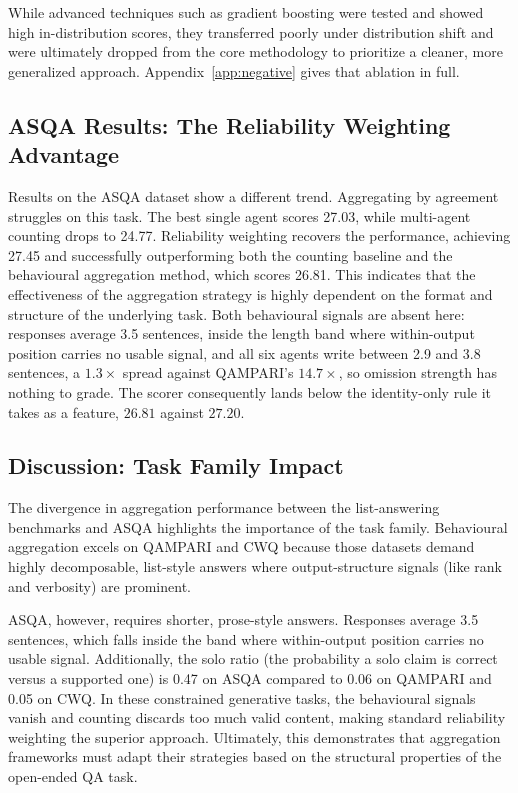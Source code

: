 \documentclass[11pt]{article}
\begin{document}
While advanced techniques such as gradient boosting were tested and showed high in-distribution scores, they transferred poorly under distribution shift and were ultimately dropped from the core methodology to prioritize a cleaner, more generalized approach. Appendix~\ref{app:negative} gives that ablation in full.
\subsection{ASQA Results: The Reliability Weighting Advantage}
\label{sec:rq3}


Results on the ASQA dataset show a different trend. Aggregating by agreement struggles on this task. The best single agent scores 27.03, while multi-agent counting drops to 24.77. Reliability weighting recovers the performance, achieving 27.45 and successfully outperforming both the counting baseline and the behavioural aggregation method, which scores 26.81. This indicates that the effectiveness of the aggregation strategy is highly dependent on the format and structure of the underlying task. Both behavioural signals are absent here: responses average 3.5 sentences, inside the length band where within-output position carries no usable signal, and all six agents write between 2.9 and 3.8 sentences, a $1.3\times$ spread against QAMPARI's $14.7\times$, so omission strength has nothing to grade. The scorer consequently lands below the identity-only rule it takes as a feature, $26.81$ against $27.20$.

\subsection{Discussion: Task Family Impact}

The divergence in aggregation performance between the list-answering benchmarks and ASQA highlights the importance of the task family. Behavioural aggregation excels on QAMPARI and CWQ because those datasets demand highly decomposable, list-style answers where output-structure signals (like rank and verbosity) are prominent.

ASQA, however, requires shorter, prose-style answers. Responses average 3.5 sentences, which falls inside the band where within-output position carries no usable signal. Additionally, the solo ratio (the probability a solo claim is correct versus a supported one) is 0.47 on ASQA compared to 0.06 on QAMPARI and 0.05 on CWQ. In these constrained generative tasks, the behavioural signals vanish and counting discards too much valid content, making standard reliability weighting the superior approach. Ultimately, this demonstrates that aggregation frameworks must adapt their strategies based on the structural properties of the open-ended QA task.
\end{document}
